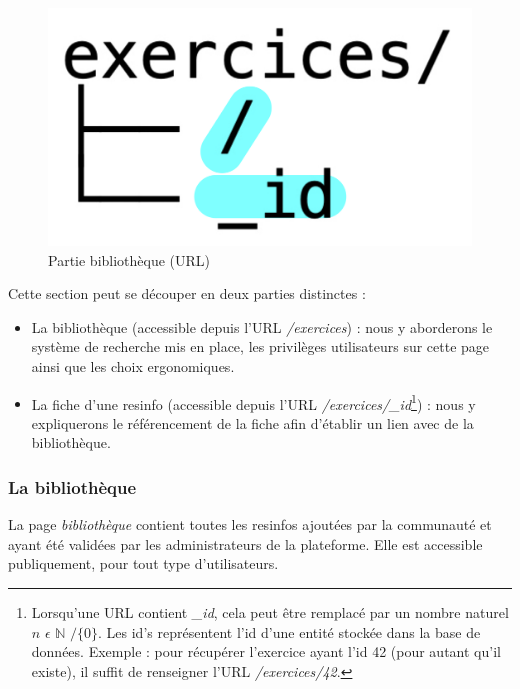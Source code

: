 \begin{figure}[H]
    \includegraphics[width=\textwidth,height=0.08\textheight,keepaspectratio]{images/client/exercices.jpeg}
    \centering
    \caption[SourceCode : partie bibliothèque]{Partie bibliothèque (URL)}
\end{figure}

Cette section peut se découper en deux parties distinctes :

\begin{itemize}
    \item La bibliothèque (accessible depuis l'URL \textit{/exercices}) : nous y aborderons le système de recherche mis en place, les privilèges utilisateurs sur cette page ainsi que les choix ergonomiques.\\
    \item La \gls{fiche} d'une \gls{resinfo} (accessible depuis l'URL \textit{/exercices/\_id}\footnote{
        Lorsqu'une URL contient \textit{\_id}, cela peut être remplacé par un nombre naturel $ n $  $\epsilon$   $\mathbb{N}$ $/ \{0\}$. Les id's représentent l'id d'une entité stockée dans la base de données. Exemple : pour récupérer l'exercice ayant l'id 42 (pour autant qu'il existe), il suffit de renseigner l'URL \textit{/exercices/42}.
    }) : nous y expliquerons le référencement de la \gls{fiche} afin d'établir un lien avec de la bibliothèque.
\end{itemize}

\subsubsection{La bibliothèque}

La page \textit{bibliothèque} contient toutes les \glspl{resinfo} ajoutées par la communauté et ayant été validées par les administrateurs de la plateforme. Elle est accessible publiquement, pour tout type d'utilisateurs.\\

